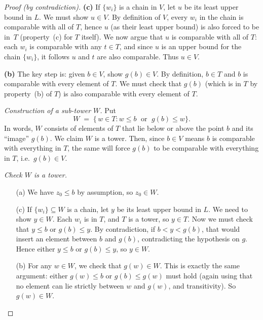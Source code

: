\documentclass[12pt]{article}
\theoremstyle{definition} %
\theoremstyle{plain} %
\begin{document}
\begin{proof}[Proof (by contradiction)]
    \textbf{(c)} If $\{w_i\}$ is a chain in $V$, let $u$ be its least 
    upper bound in $L$.  We must show $u \in V$.  By definition of $V$, 
    every $w_i$ in the chain is comparable with all of $T$, hence 
    $u$ (as their least upper bound) is also forced to be in~$T$ 
    (property~(c) for $T$ itself).  We now argue that $u$ is comparable 
    with all of $T$:  each $w_i$ is comparable with any $t \in T$, and 
    since $u$ is an upper bound for the chain $\{w_i\}$, it follows $u$ 
    and $t$ are also comparable.  Thus $u \in V$.  
    
    \textbf{(b)} The key step is: given $b \in V$, show $g(b) \in V$.  
    By definition, $b \in T$ and $b$ is comparable with every element of $T$.  
    We must check that $g(b)$ (which is in $T$ by property~(b) of $T$) 
    is also comparable with every element of $T$.  
    
    \medskip
    
    \textit{Construction of a sub-tower $W$.}  
    Put
    \[
       W \;=\; \{\, w \in T : w \le b \;\text{ or }\; g(b) \le w \}.
    \]
    In words, $W$ consists of elements of $T$ that lie below or above the 
    point $b$ and its ``image'' $g(b)$.  We claim $W$ is a tower.  
    Then, since $b \in V$ means $b$ is comparable with everything in $T$, 
    the same will force $g(b)$ to be comparable with everything in $T$, 
    i.e.\ $g(b) \in V$.
    
    \textit{Check $W$ is a tower.}  
    \begin{itemize}
    \item[(a)] We have $z_0 \le b$ by assumption, so $z_0 \in W$.
    \item[(c)] If $\{w_i\} \subseteq W$ is a chain, let $y$ be its least 
       upper bound in $L$.  We need to show $y \in W$.  
       Each $w_i$ is in $T$, and $T$ is a tower, so $y \in T$.  
       Now we must check that $y \le b$ or $g(b) \le y$.  
       By contradiction, if $b < y < g(b)$, that would insert an element 
       between $b$ and $g(b)$, contradicting the hypothesis on $g$.  
       Hence either $y \le b$ or $g(b) \le y$, so $y \in W$.  
    \item[(b)] For any $w \in W$, we check that $g(w) \in W$.  
       This is exactly the same argument: either $g(w) \le b$ or 
       $g(b) \le g(w)$ must hold (again using that no element can 
       lie strictly between $w$ and $g(w)$, and transitivity).  
       So $g(w) \in W$.  
    \end{itemize}
    

\end{proof}
\end{document}
